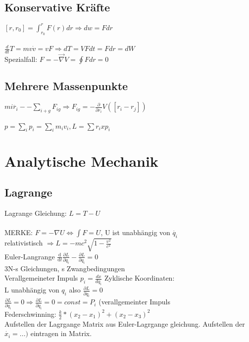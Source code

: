 \documentclass[10pt,a4paper]{article}
\begin{document}
\subsection{Konservative Kräfte}
$[r,r_0]=\int_{r_0}^r F(r) dr \Rightarrow dw = Fdr$\\
%
\\
$\frac{d}{dt}T=mv\dot{v}=vF \Rightarrow dT = VFdt = Fdr = dW$\\
Spezialfall: $F=-\vec{\nabla}V=\oint Fdr=0$\\

\subsection{Mehrere Massenpunkte}
$mi \ddot{r_i} -- \sum_{i+g} F_{ig} \Rightarrow F_{ig} = - \frac{\partial}{\partial r_i} V([r_i-r_j])$\\
%
\\
$p=\sum_i p_i = \sum_i m_i v_i, L = \sum r_i x p_i$\\







\section{Analytische Mechanik}
\subsection{Lagrange}
Lagrange Gleichung: $L = T - U$\\
%
\\
MERKE: $F = -\nabla U \Leftrightarrow \int F = U$, U ist unabhängig von $\dot{q_i}$\\
relativistisch $\Rightarrow L = -mc^2\sqrt{1-\frac{v^2}{c^2}}$
%
\\
Euler-Langrange $\frac{\text{d}}{\text{d}t} \frac{\partial L}{\partial \dot{q}_i} - \frac{\partial{L}}{\partial q_i} = 0$\\
3N-s Gleichungen, s Zwangbedingungen
%
\\
Verallgemeineter Impuls
$p_i = \frac{d x}{d q_i}$
%
Zyklische Koordinaten:\\
L unabhängig von $q_i$ also $ \frac{\partial L}{\partial q_i}=0$\\
$\frac{\partial{L}}{\partial q_i}=0 \Rightarrow \frac{\partial L}{\partial q_i}=0=const=P_i$ (verallgemeinter Impuls\\
%
Federschwinning: $\frac{k}{2}*(x_2-x_1)^2+(x_2-x_3)^2$\\
%
Aufstellen der Lagrgange Matrix aus Euler-Lagrgange gleichung. Aufstellen der $\dot{x_i}=...)$  eintragen in Matrix.
\end{document}
